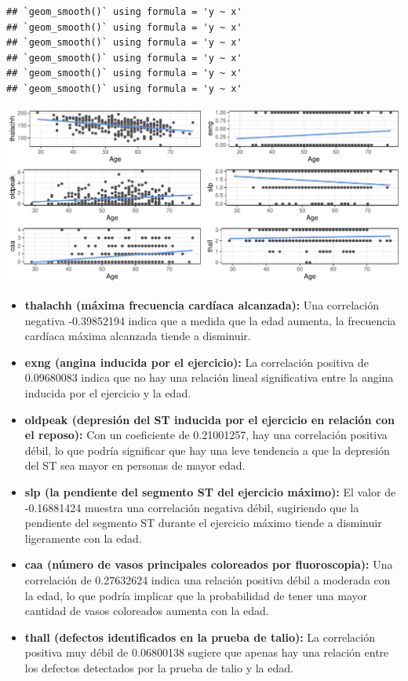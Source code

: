\documentclass[
]{article}
\begin{document}
\begin{verbatim}
## `geom_smooth()` using formula = 'y ~ x'
## `geom_smooth()` using formula = 'y ~ x'
## `geom_smooth()` using formula = 'y ~ x'
## `geom_smooth()` using formula = 'y ~ x'
## `geom_smooth()` using formula = 'y ~ x'
## `geom_smooth()` using formula = 'y ~ x'
\end{verbatim}

\includegraphics{coyolaf_ChristianOyola-PRA2_files/figure-latex/unnamed-chunk-17-1.pdf}

\begin{itemize}
\item
  \textbf{thalachh (máxima frecuencia cardíaca alcanzada):} Una
  correlación negativa -0.39852194 indica que a medida que la edad
  aumenta, la frecuencia cardíaca máxima alcanzada tiende a disminuir.
\item
  \textbf{exng (angina inducida por el ejercicio):} La correlación
  positiva de 0.09680083 indica que no hay una relación lineal
  significativa entre la angina inducida por el ejercicio y la edad.
\item
  \textbf{oldpeak (depresión del ST inducida por el ejercicio en
  relación con el reposo):} Con un coeficiente de 0.21001257, hay una
  correlación positiva débil, lo que podría significar que hay una leve
  tendencia a que la depresión del ST sea mayor en personas de mayor
  edad.
\item
  \textbf{slp (la pendiente del segmento ST del ejercicio máximo):} El
  valor de -0.16881424 muestra una correlación negativa débil,
  sugiriendo que la pendiente del segmento ST durante el ejercicio
  máximo tiende a disminuir ligeramente con la edad.
\item
  \textbf{caa (número de vasos principales coloreados por
  fluoroscopia):} Una correlación de 0.27632624 indica una relación
  positiva débil a moderada con la edad, lo que podría implicar que la
  probabilidad de tener una mayor cantidad de vasos coloreados aumenta
  con la edad.
\item
  \textbf{thall (defectos identificados en la prueba de talio):} La
  correlación positiva muy débil de 0.06800138 sugiere que apenas hay
  una relación entre los defectos detectados por la prueba de talio y la
  edad.
\end{itemize}
\end{document}

